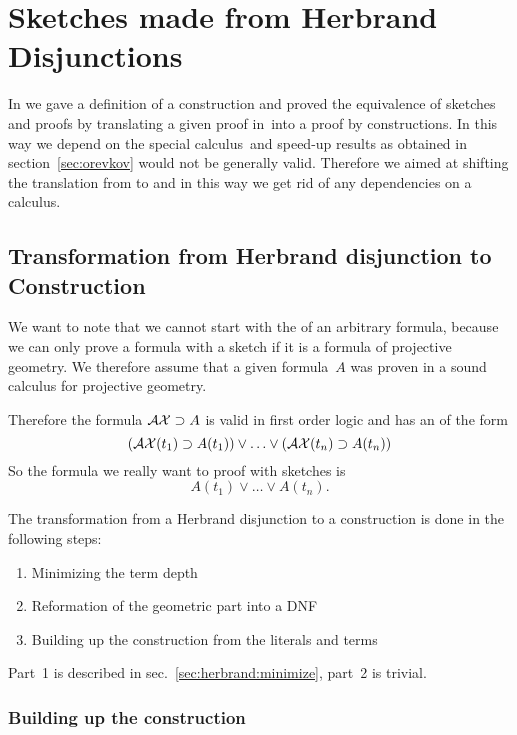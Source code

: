 %
%


\section{Sketches made from Herbrand Disjunctions}
\label{sec:herbrandsketch}

In \cite{Prei97KGC} we gave a definition of a construction and proved
the equivalence of sketches and proofs by translating a given proof
in~\pelk into a proof by constructions. In this way we depend on the
special calculus~\pelk and speed-up results as obtained in
section~\ref{sec:orevkov} would not be generally valid. Therefore we
aimed at shifting the translation from \pelk to \hd and in this way we
get rid of any dependencies on a calculus.

\subsection{Transformation from Herbrand disjunction to Construction}
\label{sec:herbrandsketch:herbratransformation}

We want to note that we cannot start with the \hd of an arbitrary formula,
because we can only prove a formula with a sketch if it is a formula of
projective geometry. We therefore assume that a given formula~$A$ was proven
in a sound calculus for projective geometry.

Therefore the formula $\Ax\limp A$ is valid in first order logic and has
an \hd of the form
   $$(\Ax(t_1)\limp A(t_1))\lor\dots\lor(\Ax(t_n)\limp A(t_n))$$
So the formula we really want to proof with sketches is
   $$A(t_1)\lor\dots\lor A(t_n).$$

The transformation from a Herbrand disjunction to a construction is done in
the following steps:
\begin{enumerate}
\item Minimizing the term depth
\item Reformation of the geometric part into a DNF
\item Building up the construction from the literals and terms
\end{enumerate}

Part~1 is described in sec.~\ref{sec:herbrand:minimize}, part~2 is
trivial. 


\subsubsection*{Building up the construction}
\label{sec:herbrandsketch:transformation:construction}

